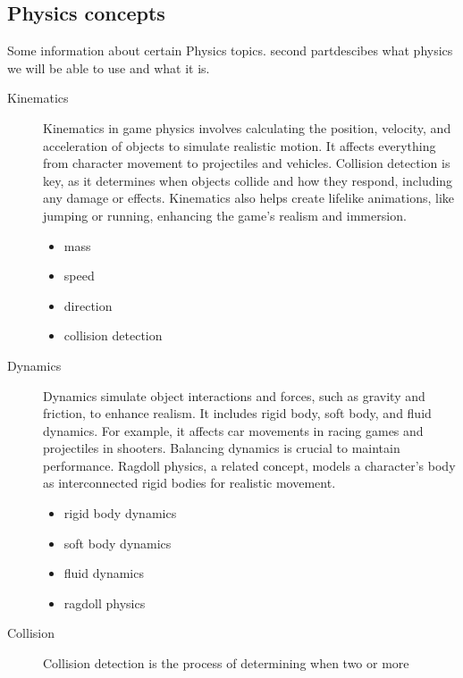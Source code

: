 \documentclass{projdoc}
\begin{document}
\subsection{Physics concepts}

Some information about certain Physics topics. second partdescibes what physics we
will be able to use and what it is.



\begin{description}
	\item[Kinematics] Kinematics in game physics involves calculating the position,
		velocity, and acceleration of objects to simulate realistic motion. It affects
		everything from character movement to projectiles and vehicles. Collision
		detection is key, as it determines when objects collide and how they respond,
		including any damage or effects. Kinematics also helps create lifelike
		animations, like jumping or running, enhancing the game's realism and immersion.
		\begin{itemize}
			\item mass
			\item speed
			\item direction
			\item collision detection
		\end{itemize}
	\item[Dynamics] Dynamics simulate object interactions and forces, such as gravity
		and friction, to enhance realism. It includes rigid body, soft body, and fluid
		dynamics. For example, it affects car movements in racing games and projectiles
		in shooters. Balancing dynamics is crucial to maintain performance. Ragdoll
		physics, a related concept, models a character's body as interconnected rigid
		bodies for realistic movement.
		\begin{itemize}
			\item rigid body dynamics
			\item soft body dynamics
			\item fluid dynamics
			\item ragdoll physics
		\end{itemize}
	\item[Collision] Collision detection is the process of determining when two or more

\end{description}
\end{document}
